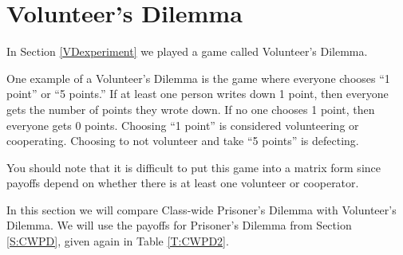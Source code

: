 
\section{Volunteer's Dilemma}



\vspace{.1in}
In Section \ref{VDexperiment} we played a game called Volunteer's Dilemma. 
\begin{example}\label{E:VDpoints}
One example of a Volunteer's Dilemma is the game where everyone chooses ``1 point'' or ``5 points.'' If at least one person writes down 1 point, then everyone gets the number of points they wrote down. If no one chooses 1 point, then everyone gets 0 points. Choosing ``1 point'' is considered volunteering or cooperating. Choosing to not volunteer and take ``5 points'' is defecting.

You should note that it is difficult to put this game into a matrix form since payoffs depend on whether there is at least one volunteer or cooperator. 
\end{example}

In this section we will compare Class-wide Prisoner's Dilemma with Volunteer's Dilemma. We will use the payoffs for Prisoner's Dilemma from Section \ref{S:CWPD}, given again in Table \ref{T:CWPD2}.



